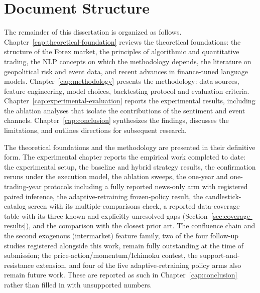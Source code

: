 \section{Document Structure} \label{sec:structure}

The remainder of this dissertation is organized as follows. Chapter~\ref{cap:theoretical-foundation} reviews the theoretical foundations: the structure of the Forex market, the principles of algorithmic and quantitative trading, the NLP concepts on which the methodology depends, the literature on geopolitical risk and event data, and recent advances in finance-tuned language models. Chapter~\ref{cap:methodology} presents the methodology: data sources, feature engineering, model choices, backtesting protocol and evaluation criteria. Chapter~\ref{cap:experimental-evaluation} reports the experimental results, including the ablation analyses that isolate the contributions of the sentiment and event channels. Chapter~\ref{cap:conclusion} synthesizes the findings, discusses the limitations, and outlines directions for subsequent research.

The theoretical foundations and the methodology are presented in their definitive form. The experimental chapter reports the empirical work completed to date: the experimental setup, the baseline and hybrid strategy results, the confirmation reruns under the execution model, the ablation sweeps, the one-year and one-trading-year protocols including a fully reported news-only arm with registered paired inference, the adaptive-retraining frozen-policy result, the candlestick-catalog screen with its multiple-comparisons check, a reported data-coverage table with its three known and explicitly unresolved gaps (Section~\ref{sec:coverage-results}), and the comparison with the closest prior art. The confluence chain and the second exogenous (intermarket) feature family, two of the four follow-up studies registered alongside this work, remain fully outstanding at the time of submission; the price-action/momentum/Ichimoku contest, the support-and-resistance extension, and four of the five adaptive-retraining policy arms also remain future work. These are reported as such in Chapter~\ref{cap:conclusion} rather than filled in with unsupported numbers.
